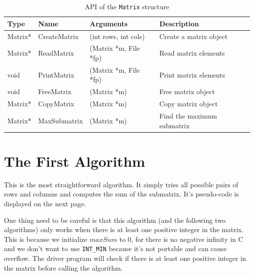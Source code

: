 \documentclass[a4paper,oneside]{book}
\begin{document}
\begin{table}[!ht]
    \centering
    \caption{API of the \texttt{Matrix} structure}
    \begin{tabular}{R{0.1\textwidth} R{0.2\textwidth} p{0.2\textwidth} p{0.3\textwidth}}
        \toprule
        Type    & Name         & Arguments             & Description                \\
        \midrule
        Matrix* & CreateMatrix & (int rows, int cols)  & Create a matrix object     \\
        Matrix* & ReadMatrix   & (Matrix *m, File *fp) & Read matrix elements       \\
        void    & PrintMatrix  & (Matrix *m, File *fp) & Print matrix elements      \\
        void    & FreeMatrix   & (Matrix *m)           & Free matrix object         \\
        Matrix* & CopyMatrix   & (Matrix *m)           & Copy matrix object         \\
        Matrix* & MaxSubmatrix & (Matrix *m)           & Find the maximum submatrix \\
        \bottomrule
    \end{tabular}
\end{table}

\section{The First Algorithm}

This is the most straightforward algorithm. It simply tries all possible pairs
of rows and columns and computes the sum of the submatrix. It's pseudo-code is
displayed on the next page.

One thing need to be careful is that this algorithm (and the following two
algorithms) only works when there is at least one positive integer in the
matrix. This is because we initialize $maxSum$ to $0$, for there is no negative
infinity in C and we don't want to use \verb|INT_MIN| because it's not portable
and can cause overflow. The driver program will check if there is at least one
positive integer in the matrix before calling the algorithm.
\end{document}
